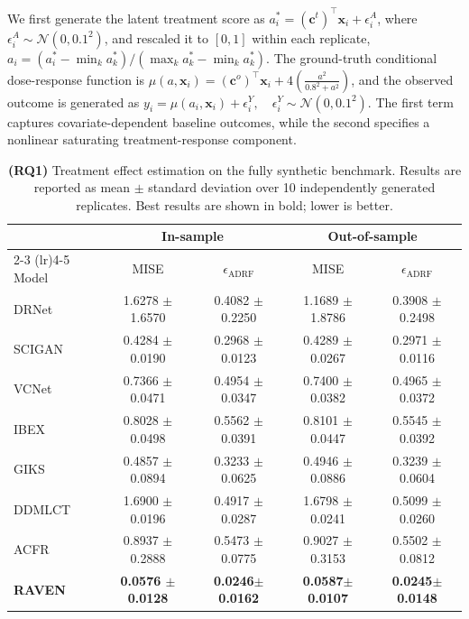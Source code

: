 \documentclass[twoside]{article}
\theoremstyle{plain}
\theoremstyle{definition}
\theoremstyle{remark}
\newtheorem{proof sketch}[theorem]{Proof Sketch}
\begin{document}
We first generate the latent treatment score as $a_i^{*}=(\mathbf{c}^{t})^{\top}\mathbf{x}_i+\epsilon_i^{A}$, where $\epsilon_i^{A}\sim\mathcal{N}(0,0.1^2)$, and rescaled it to \([0,1]\) within each replicate, $a_i={(a_i^{*}-\min_k a_k^{*})}/{(\max_k a_k^{*}-\min_k a_k^{*})}$.
The ground-truth conditional dose-response function is  $\mu(a,\mathbf{x}_i)=(\mathbf{c}^{o})^{\top}\mathbf{x}_i+4(\frac{a^2}{0.8^2+a^2})$,
and the observed outcome is generated as $y_i=\mu(a_i,\mathbf{x}_i)+\epsilon_i^{Y}, \quad \epsilon_i^{Y}\sim\mathcal{N}(0,0.1^2)$.
The first term captures covariate-dependent baseline outcomes, while the second specifies a nonlinear saturating treatment-response component. 


\begin{table}
\centering
\caption{\textbf{(RQ1)} 
Treatment effect estimation on the fully synthetic benchmark. 
Results are reported as mean \(\pm\) standard deviation over 10 independently generated replicates. Best results are shown in bold; lower is better.}%
\footnotesize
\label{Table1}
\begin{tabular}{lcccc}
\toprule
 & \multicolumn{2}{c}{In-sample} & \multicolumn{2}{c}{Out-of-sample} \\
\cmidrule(lr){2-3} \cmidrule(lr){4-5}
Model & MISE & $\epsilon_{\text{ADRF}}$ & MISE & $\epsilon_{\text{ADRF}}$ \\
\midrule
DRNet & 1.6278 $\pm$ 1.6570 & 0.4082 $\pm$ 0.2250 & 1.1689 $\pm$ 1.8786 & 0.3908 $\pm$ 0.2498 \\
SCIGAN & 0.4284 $\pm$ 0.0190 & 0.2968 $\pm$ 0.0123 & 0.4289 $\pm$ 0.0267 & 0.2971 $\pm$ 0.0116 \\
VCNet & 0.7366 $\pm$ 0.0471 & 0.4954 $\pm$ 0.0347 & 0.7400 $\pm$ 0.0382 & 0.4965 $\pm$ 0.0372 \\
IBEX & 0.8028 $\pm$ 0.0498 & 0.5562 $\pm$ 0.0391 & 0.8101 $\pm$ 0.0447 & 0.5545 $\pm$ 0.0392 \\
GIKS & 0.4857 $\pm$ 0.0894 & 0.3233 $\pm$ 0.0625 & 0.4946 $\pm$ 0.0886 & 0.3239 $\pm$ 0.0604 \\
DDMLCT & 1.6900 $\pm$ 0.0196 & 0.4917 $\pm$ 0.0287 & 1.6798 $\pm$ 0.0241 & 0.5099 $\pm$ 0.0260 \\
ACFR & 0.8937 $\pm$ 0.2888 & 0.5473 $\pm$ 0.0775 & 0.9027 $\pm$ 0.3153 & 0.5502 $\pm$ 0.0812 \\
\rowcolor{blue!10}
\textbf{RAVEN} & \textbf{0.0576 $\pm$ 0.0128}& \textbf{0.0246$\pm$ 0.0162}& \textbf{0.0587$\pm$ 0.0107}& \textbf{0.0245$\pm$ 0.0148}\\
\bottomrule
\end{tabular}
\end{table}
\end{document}
